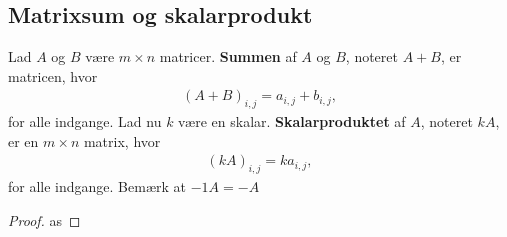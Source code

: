 \subsection{Matrixsum og skalarprodukt}
%
\begin{defn}{}{}
Lad $A$ og $B$ være $m \times n$ matricer.
\textbf{Summen} af $A$ og $B$, noteret $A + B$, er matricen, hvor
\begin{align*}
(A + B)_{i,j} = a_{i,j} + b_{i,j},
\end{align*}
for alle indgange.
Lad nu $k$ være en skalar.
\textbf{Skalarproduktet} af $A$, noteret $kA$, er en $m \times n$ matrix, hvor
\begin{align*}
(kA)_{i,j} = ka_{i,j},
\end{align*}
for alle indgange. Bemærk at $-1A = -A$
\end{defn}
%
\begin{proof}
as
\end{proof}